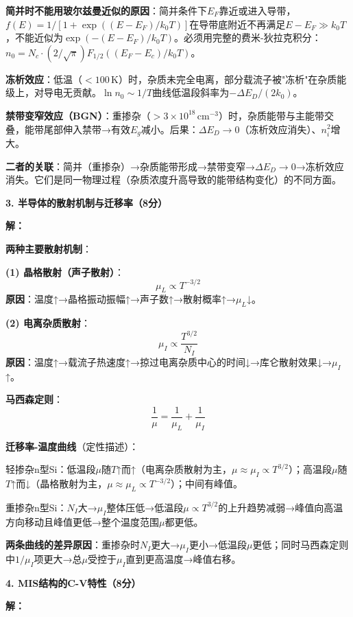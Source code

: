 \documentclass[12pt,a4paper]{ctexart}
\begin{document}
\textbf{简并时不能用玻尔兹曼近似的原因}：简并条件下$E_F$靠近或进入导带，$f(E) = 1/[1+\exp((E-E_F)/k_0T)]$在导带底附近不再满足$E-E_F \gg k_0T$，不能近似为$\exp(-(E-E_F)/k_0T)$。必须用完整的费米-狄拉克积分：$n_0 = N_c \cdot (2/\sqrt{\pi})F_{1/2}((E_F-E_c)/k_0T)$。

\textbf{冻析效应}：低温（$< 100\,\text{K}$）时，杂质未完全电离，部分载流子被"冻析"在杂质能级上，对导电无贡献。$\ln n_0 \sim 1/T$曲线低温段斜率为$-\Delta E_D/(2k_0)$。

\textbf{禁带变窄效应（BGN）}：重掺杂（$>3\times10^{18}\,\text{cm}^{-3}$）时，杂质能带与主能带交叠，能带尾部伸入禁带→有效$E_g$减小。后果：$\Delta E_D \to 0$（冻析效应消失）、$n_i^2$增大。

\textbf{二者的关联}：简并（重掺杂）→杂质能带形成→禁带变窄→$\Delta E_D \to 0$→冻析效应消失。它们是同一物理过程（杂质浓度升高导致的能带结构变化）的不同方面。

\vspace{1cm}

\noindent\textbf{3. 半导体的散射机制与迁移率（8分）}

\textbf{解：}\quad

\textbf{两种主要散射机制}：

\textbf{(1) 晶格散射（声子散射）}：
\[
\mu_L \propto T^{-3/2}
\]
\textbf{原因}：温度↑→晶格振动振幅↑→声子数↑→散射概率↑→$\mu_L$↓。

\textbf{(2) 电离杂质散射}：
\[
\mu_I \propto \frac{T^{3/2}}{N_I}
\]
\textbf{原因}：温度↑→载流子热速度↑→掠过电离杂质中心的时间↓→库仑散射效果↓→$\mu_I$↑。

\textbf{马西森定则}：
\[
\frac{1}{\mu} = \frac{1}{\mu_L} + \frac{1}{\mu_I}
\]

\textbf{迁移率-温度曲线}（定性描述）：

轻掺杂n型Si：低温段$\mu$随$T$↑而↑（电离杂质散射为主，$\mu \approx \mu_I \propto T^{3/2}$）；高温段$\mu$随$T$↑而↓（晶格散射为主，$\mu \approx \mu_L \propto T^{-3/2}$）；中间有峰值。

重掺杂n型Si：$N_I$大→$\mu_I$整体压低→低温段$\mu \propto T^{3/2}$的上升趋势减弱→峰值向高温方向移动且峰值更低→整个温度范围$\mu$都更低。

\textbf{两条曲线的差异原因}：重掺杂时$N_I$更大→$\mu_I$更小→低温段$\mu$更低；同时马西森定则中$1/\mu_I$项更大→总$\mu$受控于$\mu_I$直到更高温度→峰值右移。

\vspace{1cm}

\noindent\textbf{4. MIS结构的C-V特性（8分）}

\textbf{解：}\quad
\end{document}
